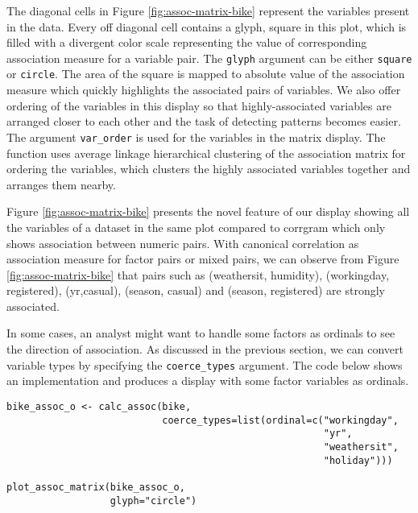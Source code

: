 The diagonal cells in Figure \ref{fig:assoc-matrix-bike} represent the variables present in the data. Every off diagonal cell contains a glyph, square in this plot, which is filled with a divergent color scale representing the value of corresponding association measure for a variable pair. The \texttt{glyph} argument can be either \texttt{square} or \texttt{circle}. The area of the square is mapped to absolute value of the association measure which quickly highlights the associated pairs of variables. We also offer ordering of the variables in this display so that highly-associated variables are arranged closer to each other and the task of detecting patterns becomes easier. The argument \texttt{var\_order} is used for the variables in the matrix display. The function uses average linkage hierarchical clustering of the association matrix for ordering the variables, which clusters the highly associated variables together and arranges them nearby.

Figure \ref{fig:assoc-matrix-bike} presents the novel feature of our display showing all the variables of a dataset in the same plot compared to corrgram which only shows association between numeric pairs. With canonical correlation as association measure for factor pairs or mixed pairs, we can observe from Figure \ref{fig:assoc-matrix-bike} that pairs such as (weathersit, humidity), (workingday, registered), (yr,casual), (season, casual) and (season, registered) are strongly associated.

In some cases, an analyst might want to handle some factors as ordinals to see the direction of association. As discussed in the previous section, we can convert variable types by specifying the \texttt{coerce\_types} argument. The code below shows an implementation and produces a display with some factor variables as ordinals.

\begin{verbatim}
bike_assoc_o <- calc_assoc(bike, 
                           coerce_types=list(ordinal=c("workingday", 
                                                       "yr", 
                                                       "weathersit", 
                                                       "holiday")))

plot_assoc_matrix(bike_assoc_o,
                  glyph="circle")
\end{verbatim}


